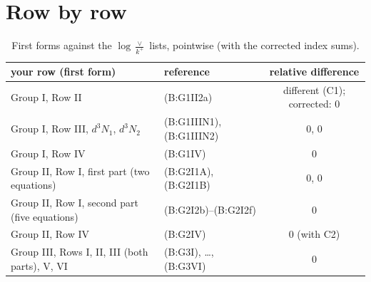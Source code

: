 \documentclass[10pt]{article}
\newcommand{\old}[1]{{\color{red}#1}}
\newcommand{\LV}{\log\frac{\vee}{k^+}}
\begin{document}
\section{Row by row}
\begin{table}[H]\centering\small
\begin{tabular}{llc}
\toprule
your row (first form) & reference & relative difference\\
\midrule
Group I, Row II & (B:G1II2a) & \old{different} (C1); corrected: $0$\\
Group I, Row III, $d^3N_1$, $d^3N_2$ & (B:G1IIIN1), (B:G1IIIN2) & $0$, $0$\\
Group I, Row IV & (B:G1IV) & $0$\\
Group II, Row I, first part (two equations) & (B:G2I1A), (B:G2I1B) & $0$, $0$\\
Group II, Row I, second part (five equations) & (B:G2I2b)--(B:G2I2f) & $0$\\
Group II, Row IV & (B:G2IV) & $0$ (with C2)\\
Group III, Rows I, II, III (both parts), V, VI & (B:G3I), \dots, (B:G3VI) & $0$\\
\bottomrule
\end{tabular}
\caption{First forms against the $\LV$ lists, pointwise (with the corrected index sums).}\label{tab:first}
\end{table}
\end{document}
